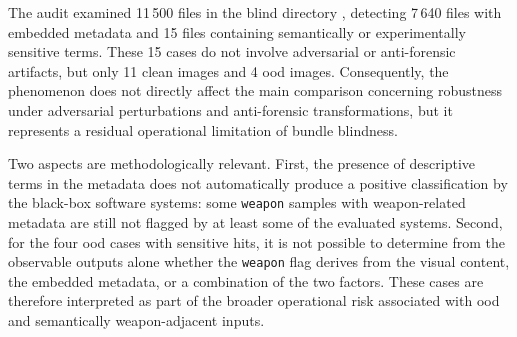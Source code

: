 The audit examined 11\,500 files in the blind directory
, detecting
7\,640 files with embedded metadata and 15 files containing semantically or
experimentally sensitive terms. These 15 cases do not involve adversarial or
anti-forensic artifacts, but only 11 clean images and 4 \gls{ood} images.
Consequently, the phenomenon does not directly affect the main comparison
concerning robustness under adversarial perturbations and anti-forensic
transformations, but it represents a residual operational limitation of bundle
blindness.

Two aspects are methodologically relevant. First, the presence of descriptive
terms in the metadata does not automatically produce a positive classification
by the black-box software systems: some \texttt{weapon} samples with
weapon-related metadata are still not flagged by at least some of the evaluated
systems. Second, for the four \gls{ood} cases with sensitive hits, it is not
possible to determine from the observable outputs alone whether the
\texttt{weapon} flag derives from the visual content, the embedded metadata, or
a combination of the two factors. These cases are therefore interpreted as part
of the broader operational risk associated with \gls{ood} and semantically
weapon-adjacent inputs.

